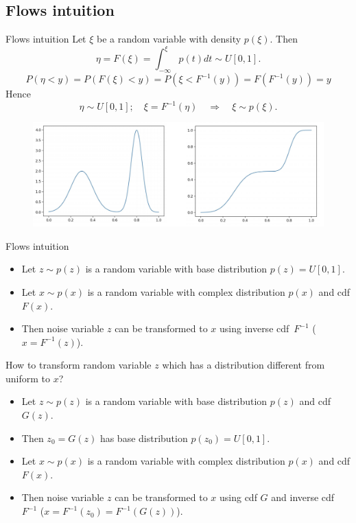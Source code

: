 \subsection{Flows intuition}
\begin{frame}{Flows intuition}
	Let $\xi$ be a random variable with density $p(\xi)$. Then
	\[
	\eta = F(\xi) = \int_{-\infty}^\xi p(t)dt \sim U[0, 1].
	\]
	\[
	P(\eta < y) = P(F(\xi) < y) = P(\xi < F^{-1}(y)) = F(F^{-1}(y)) = y
	\]
	Hence
	\[
	\eta \sim U[0, 1]; \quad \xi = F^{-1}(\eta) \quad \Rightarrow \quad \xi \sim p(\xi).
	\]
	\begin{figure}
		\includegraphics[width=\linewidth]{figs/flows_1d}
	\end{figure}
	
\end{frame}
\begin{frame}{Flows intuition}
	\begin{itemize}
		\item Let $z \sim p(z)$ is a random variable with base distribution $p(z) = U[0, 1]$. 
		\item Let $x \sim p(x)$ is a random variable with complex distribution $p(x)$ and cdf $F(x)$. 
		\item Then noise variable $z$ can be transformed to $x$ using inverse cdf~$F^{-1}$ ($x = F^{-1}(z)$).
	\end{itemize}
	How to transform random variable $z$  which has a distribution different from uniform to $x$?
	\begin{itemize}
		\item Let $z \sim p(z)$ is a random variable with base distribution $p(z)$ and cdf $G(z)$.
		\item Then $z_0 = G(z)$ has base distribution $p(z_0) = U[0, 1]$.
		\item Let $x \sim p(x)$ is a random variable with complex distribution $p(x)$ and cdf $F(x)$. 
		\item Then noise variable $z$ can be transformed to $x$ using cdf $G$ and inverse cdf~$F^{-1}$ ($x = F^{-1}(z_0) = F^{-1}(G(z))$).
	\end{itemize}
\end{frame}
